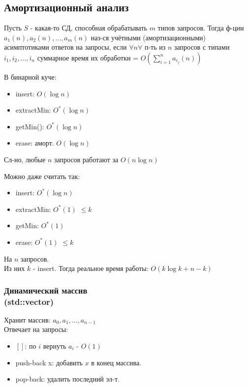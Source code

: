 \subsection{Амортизационный анализ}
\begin{definition}
Пусть $S$ - какая-то СД, способная обрабатывать $m$ типов запросов. Тогда ф-ции $a_1(n), a_2(n), \ldots, a_m(n)$ наз-ся учётными (амортизационными) асимптотиками ответов на запросы, если $\forall n \forall$ п-ть из $n$ запросов с типами $i_1, i_2, \ldots, i_n$ суммарное время их обработки = $O(\sum_{i = 1}^{n}a_{i_j}(n))$
\end{definition}
\begin{example}
В бинарной куче:
\begin{itemize}
  \item insert: $O(\log n)$
  \item extractMin: $O^{*}(\log n)$
  \item getMin(): $O^{*}(\log n)$
  \item erase: аморт. $O(\log n)$
\end{itemize}
Сл-но, любые $n$ запросов работают за $O(n\log n)$
\end{example}
\begin{note}
Можно даже считать так:
\begin{itemize}
  \item insert: $O^{*}(\log n)$
  \item extractMin: $O^{*}(1)$ $\leq k$
  \item getMin: $O^{*}(1)$
  \item erase: $O^{*}(1)$ $\leq k$
\end{itemize}
На $n$ запросов. \\
Из них $k$ - insert. Тогда реальное время работы: $O(k\log k + n - k)$
\end{note}
\subsubsection{Динамический массив \\ (std::vector)}
Хранит массив: $a_0, a_1, \ldots, a_{n - 1}$ \\
Отвечает на запросы:
\begin{itemize}
  \item $[]$: по $i$ вернуть $a_i$ - $O(1)$
  \item push-back x: добавить $x$ в конец массива.
  \item pop-back: удалить последний эл-т.
\end{itemize}
